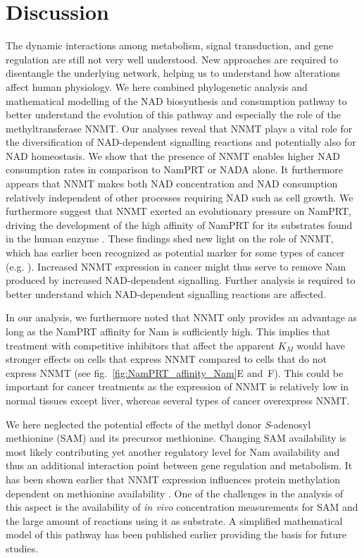 
\section{Discussion}

The dynamic interactions among metabolism, signal transduction, and gene regulation are still not very well understood. New approaches are required to disentangle the underlying network, helping us to understand how alterations affect human physiology. We here combined phylogenetic analysis and mathematical modelling of the NAD biosynthesis and consumption pathway to better understand the evolution of this pathway and especially the role of the methyltransferase NNMT. Our analyses reveal that NNMT plays a vital role for the diversification of NAD-dependent signalling reactions and potentially also for NAD homeostasis. We show that the presence of NNMT enables higher NAD consumption rates in comparison to NamPRT or NADA alone. It furthermore appears that NNMT makes both NAD concentration and NAD consumption relatively independent of other processes requiring NAD such as cell growth. We furthermore suggest that NNMT exerted an evolutionary pressure on NamPRT, driving the development of the high affinity of NamPRT for its substrates found in the human enzyme \cite{Burgos2008}. These findings shed new light on the role of NNMT, which has earlier been recognized as potential marker for some types of cancer (e.g. \cite{Okamura1998}). Increased NNMT expression in cancer might thus serve to remove Nam produced by increased NAD-dependent signalling. Further analysis is required to better understand which NAD-dependent signalling reactions are affected.

In our analysis, we furthermore noted that NNMT only provides an advantage as long as the NamPRT affinity for Nam is sufficiently high. This implies that treatment with competitive inhibitors that affect the apparent $K_{M}$ would have stronger effects on cells that express NNMT compared to cells that do not express NNMT (see fig.~\ref{fig:NamPRT_affinity_Nam}E and~F). This could be important for cancer treatments as the expression of NNMT is relatively low in normal tissues except liver, whereas several types of cancer overexpress NNMT.

We here neglected the potential effects of the methyl donor \textit{S}-adenosyl methionine (SAM) and its precursor methionine. Changing SAM availability is most likely contributing yet another regulatory level for Nam availability and thus an additional interaction point between gene regulation and metabolism. It has been shown earlier that NNMT expression influences protein methylation dependent on methionine availability \cite{Ulanovskaya2013}. One of the challenges in the analysis of this aspect is the availability of \textit{in vivo} concentration measurements for SAM and the large amount of reactions using it as substrate. A simplified mathematical model of this pathway has been published earlier \cite{Reed2004} providing the basis for future studies.

